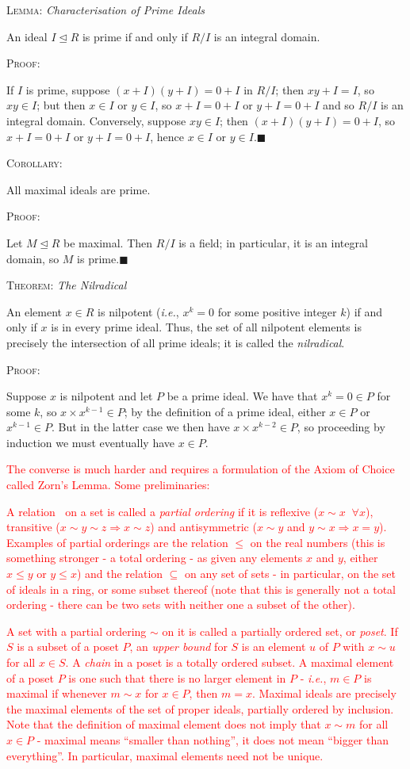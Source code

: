 \documentclass[12pt,a4paper]{article}
\newcommand{\proof}{\noindent\textsc{\large Proof:}\par}
\newcommand{\thm}[1]{\noindent\textsc{\large Theorem:}  \textit{\large #1}\par}
\newcommand{\lemma}[1]{\noindent\textsc{\large Lemma:}  \textit{\large #1}\par}
\newcommand{\corol}[1]{\noindent\textsc{\large Corollary:}  \textit{\large #1}\par}
\newcommand{\qed}{\hfill$\blacksquare$\gap}
\newcommand{\red}[1]{\textcolor{red}{#1}}
\newcommand{\gap}{\par \vspace{5mm}}
\let\ideal\trianglelefteq
\begin{document}
\lemma{Characterisation of Prime Ideals}
An ideal $I\ideal R$ is prime if and only if $R/I$ is an integral domain.\gap

\proof
If $I$ is prime, suppose $(x+I)(y+I)=0+I$ in $R/I$; then $xy+I=I$, so $xy\in I$; but then $x\in I$ or $y\in I$, so $x+I=0+I$ or $y+I=0+I$ and so $R/I$ is an integral domain. Conversely, suppose $xy\in I$; then $(x+I)(y+I)=0+I$, so $x+I=0+I$ or $y+I=0+I$, hence $x\in I$ or $y\in I$.\qed

\corol{}
All maximal ideals are prime.\gap

\proof
Let $M\ideal R$ be maximal. Then $R/I$ is a field; in particular, it is an integral domain, so $M$ is prime.\qed

\thm{The Nilradical}
An element $x\in R$ is nilpotent (\textit{i.e.}, $x^k=0$ for some positive integer $k$) if and only if $x$ is in every prime ideal. Thus, the set of all nilpotent elements is precisely the intersection of all prime ideals; it is called the \textit{nilradical}.\gap

\proof
Suppose $x$ is nilpotent and let $P$ be a prime ideal. We have that $x^k=0\in P$ for some $k$, so $x\times x^{k-1}\in P$; by the definition of a prime ideal, either $x\in P$ or $x^{k-1}\in P$. But in the latter case we then have $x\times x^{k-2}\in P$, so proceeding by induction we must eventually have $x \in P$.

\red{The converse is much harder and requires a formulation of the Axiom of Choice called Zorn's Lemma. Some preliminaries:}

\red{A relation $~$ on a set is called a \textit{partial ordering} if it is reflexive ($x\sim x \;\;\forall x$), transitive ($x\sim y\sim z\Rightarrow x\sim z$) and antisymmetric ($x\sim y$ and $y\sim x \Rightarrow x=y$). Examples of partial orderings are the relation $\leq$ on the real numbers (this is something stronger - a total ordering - as given any elements $x$ and $y$, either $x\leq y$ or $y\leq x$) and the relation $\subseteq$ on any set of sets - in particular, on the set of ideals in a ring, or some subset thereof (note that this is generally not a total ordering - there can be two sets with neither one a subset of the other).}

\red{A set with a partial ordering $\sim$ on it is called a partially ordered set, or \textit{poset}. If $S$ is a subset of a poset $P$, an \textit{upper bound} for $S$ is an element $u$ of $P$ with $x\sim u$ for all $x\in S$. A \textit{chain} in a poset is a totally ordered subset. A maximal element of a poset $P$ is one such that there is no larger element in $P$ - \textit{i.e.}, $m\in P$ is maximal if whenever $m\sim x$ for $x\in P$, then $m=x$. Maximal ideals are precisely the maximal elements of the set of proper ideals, partially ordered by inclusion. Note that the definition of maximal element does not imply that $x\sim m$ for all $x\in P$ - maximal means ``smaller than nothing'', it does not mean ``bigger than everything''. In particular, maximal elements need not be unique.}
\end{document}
